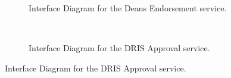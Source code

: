 \documentclass[12pt]{article}
\begin{document}
\begin{figure}[H]
\begin{subfigure}[p]{0.47\textwidth}
\centering	
{}
\caption{Interface Diagram for the Deans Endorsement service.}
\end{subfigure}
~
\begin{subfigure}[p]{0.47\textwidth}
\centering	
{}
\caption{Interface Diagram for the DRIS Approval service.}
\end{subfigure}
\end{figure}
\end{document}
